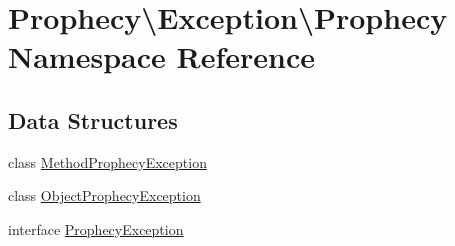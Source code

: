 \hypertarget{namespace_prophecy_1_1_exception_1_1_prophecy}{}\section{Prophecy\textbackslash{}Exception\textbackslash{}Prophecy Namespace Reference}
\label{namespace_prophecy_1_1_exception_1_1_prophecy}
\subsection*{Data Structures}
\begin{DoxyCompactItemize}
\item 
class \mbox{\hyperlink{class_prophecy_1_1_exception_1_1_prophecy_1_1_method_prophecy_exception}{Method\+Prophecy\+Exception}}
\item 
class \mbox{\hyperlink{class_prophecy_1_1_exception_1_1_prophecy_1_1_object_prophecy_exception}{Object\+Prophecy\+Exception}}
\item 
interface \mbox{\hyperlink{interface_prophecy_1_1_exception_1_1_prophecy_1_1_prophecy_exception}{Prophecy\+Exception}}
\end{DoxyCompactItemize}
